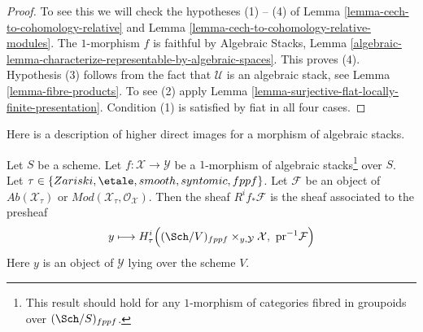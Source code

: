 \begin{proof}
To see this we will check the hypotheses (1) -- (4) of
Lemma \ref{lemma-cech-to-cohomology-relative} and
Lemma \ref{lemma-cech-to-cohomology-relative-modules}.
The $1$-morphism $f$ is faithful by
Algebraic Stacks, Lemma
\ref{algebraic-lemma-characterize-representable-by-algebraic-spaces}.
This proves (4).
Hypothesis (3) follows from the fact that $\mathcal{U}$ is an algebraic
stack, see
Lemma \ref{lemma-fibre-products}.
To see (2) apply
Lemma \ref{lemma-surjective-flat-locally-finite-presentation}.
Condition (1) is satisfied by fiat in all four cases.
\end{proof}

\noindent
Here is a description of higher direct images for a
morphism of algebraic stacks.

\begin{lemma}
\label{lemma-pushforward-restriction}
Let $S$ be a scheme. Let $f : \mathcal{X} \to \mathcal{Y}$ be a
$1$-morphism of algebraic stacks\footnote{This result should hold
for any $1$-morphism of categories fibred in groupoids over
$(\Sch/S)_{fppf}$.} over $S$.
Let $\tau \in \{Zariski,\linebreak[0] \etale,\linebreak[0]
smooth,\linebreak[0] syntomic,\linebreak[0] fppf\}$.
Let $\mathcal{F}$ be
an object of $\textit{Ab}(\mathcal{X}_\tau)$ or
$\textit{Mod}(\mathcal{X}_\tau, \mathcal{O}_\mathcal{X})$.
Then the sheaf $R^if_*\mathcal{F}$ is the sheaf associated to the
presheaf
$$
y \longmapsto
H^i_\tau\Big((\Sch/V)_{fppf} \times_{y, \mathcal{Y}} \mathcal{X},
\ \text{pr}^{-1}\mathcal{F}\Big)
$$
Here $y$ is an object of $\mathcal{Y}$ lying over the scheme $V$.
\end{lemma}

